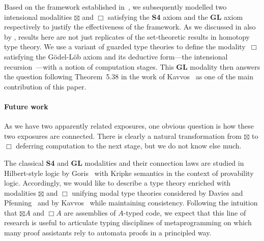 \documentclass[a4paper,UKenglish,numberwithinsect,cleveref,thm-restate]{lipics-v2021}
\numberwithin{equation}{section}
\newcommand{\SFour}{\textbf{S4}}
\newcommand{\GL}{\textbf{GL}}
\theoremstyle{plain}
\begin{document}
Based on the framework established in~, we subsequently modelled two intensional modalities $\boxtimes$ and $\Box$ satisfying the {\SFour} axiom and the {\GL} axiom respectively to justify the effectiveness of the framework.
As we discussed in  also by , results here are not just replicates of the set-theoretic results in homotopy type theory. 
We use a variant of guarded type theories to define the modality~$\Box$ satisfying the Gödel-Löb axiom and its deductive form---the intensional recursion~\cite{Kavvos2017b}---with a notion of computation stages.
This {\GL} modality then answers the question following Theorem~5.38 in the work of Kavvos~\cite{Kavvos2020} as one of the main contribution of this paper.

\paragraph*{Future work}
As we have two apparently related exposures, one obvious question is how these two exposures are connected.
There is clearly a natural transformation from $\boxtimes$ to $\Box$ deferring computation to the next stage, but we do not know else much.

The classical {\SFour} and {\GL} modalities and their connection laws are studied in Hilbert-style logic by Goris~\cite{Goris2009} with Kripke semantics in the context of provability logic.
Accordingly, we would like to describe a type theory enriched with modalities $\boxtimes$ and $\Box$ unifying modal type theories considered by Davies and Pfenning~\cite{Davies2001b} and by Kavvos~\cite{Kavvos2017b,Kavvos2020} while maintaining consistency.
Following the intuition that $\boxtimes A$ and $\Box A$ are assemblies of $A$-typed code, we expect that this line of research is useful to articulate typing disciplines of metaprogramming on which many proof assistants rely to automata proofs in a principled way.


%
%  
\end{document}
